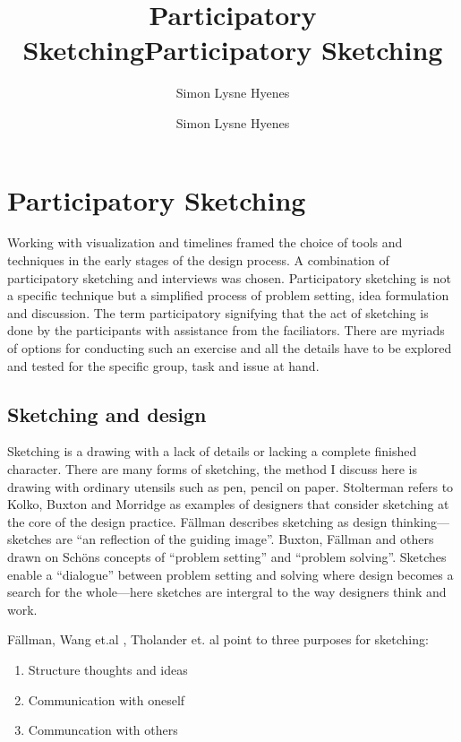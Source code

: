 \documentclass[11pt,UKenglish, a4paper]{article}
\author{Simon Lysne Hyenes}
\title{Participatory Sketching}
\author{Simon Lysne Hyenes}
\title{Participatory Sketching}
\begin{document}
\section{Participatory Sketching}
Working with visualization and timelines framed the choice of tools and techniques in the early stages of the design process. A combination of participatory sketching and interviews was chosen. Participatory sketching is not a specific technique but a simplified process of problem setting, idea formulation and discussion. The term participatory signifying that the act of sketching is done by the participants with assistance from the faciliators. There are myriads of options for conducting such an exercise and all the details have to be explored and tested for the specific group, task and issue at hand. 

\subsection{Sketching and design}
Sketching is a drawing with a lack of details or lacking a complete finished character. There are many forms of sketching, the method I discuss here is drawing with ordinary utensils such as pen, pencil on paper. Stolterman refers to Kolko, Buxton and Morridge \cite[p.61]{Stolterman????Nature} as examples of designers that consider sketching at the core of the design practice.  
Fällman describes sketching as design thinking---sketches are ``an reflection of the guiding image''\cite[p.230]{Fallman2003DesignOriented}. Buxton, Fällman and others drawn on Schöns concepts of ``problem setting'' and ``problem solving''\cite[p.230]{Fallman2003DesignOriented}. Sketches enable a ``dialogue'' between problem setting and solving where design becomes a search for the whole---here sketches are intergral to the way designers think and work\cite[p.230]{Fallman2003DesignOriented}.

Fällman\cite[p.230]{Fallman2003DesignOriented}, Wang et.al \cite[p.2]{Wang2012User}, Tholander et. al\cite[p.446]{Tholander2008Where} point to three purposes for sketching: 
\begin{enumerate}
\item{Structure thoughts and ideas}
\item{Communication with oneself}
\item{Communcation with others}
\end{enumerate}
\end{document}
